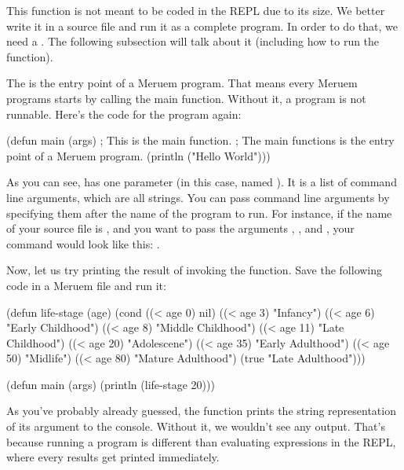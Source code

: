 This function is not meant to be coded in the REPL due to its size. We better write it in a source file and run it as a complete program. In order to do that, we need a . The following subsection will talk about it (including how to run the  function).

The  is the entry point of a Meruem program. That means every Meruem programs starts by calling the main function. Without it, a program is not runnable. Here's the code for the  program again:

\begin{REPL}
(defun main (args)    ; This is the main function.
  ; The main functions is the entry point of a Meruem program.
  (println ("Hello World")))
\end{REPL}

As you can see,  has one parameter (in this case, named ). It is a list of command line arguments, which are all strings. You can pass command line arguments by specifying them after the name of the program to run. For instance, if the name of your source file is , and you want to pass the arguments , , and , your command would look like this: .

Now, let us try printing the result of invoking the  function. Save the following code in a Meruem file and run it:

\begin{Meruem}
(defun life-stage (age)
   (cond 
     ((< age 0) nil)
     ((< age 3) "Infancy")
     ((< age 6) "Early Childhood")
     ((< age 8) "Middle Childhood")
     ((< age 11) "Late Childhood")
     ((< age 20) "Adolescene")
     ((< age 35) "Early Adulthood")
     ((< age 50) "Midlife")
     ((< age 80) "Mature Adulthood")
     (true "Late Adulthood")))

(defun main (args)
  (println (life-stage 20)))
\end{Meruem}

As you've probably already guessed, the  function prints the string representation of its argument to the console. Without it, we wouldn't see any output. That's because running a program is different than evaluating expressions in the REPL, where every results get printed immediately.

